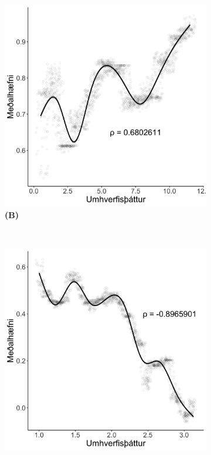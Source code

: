\documentclass[12pt]{article}
\begin{document}
\begin{figure}[h]
\begin{subfigure}{.5\textwidth}
        \includegraphics[width=\textwidth]{img/plotB.png}
        \caption*{\bfseries (B)}
    \end{subfigure} \\
    \begin{subfigure}{.5\textwidth}
        \centering
        \includegraphics[width=\textwidth]{img/plotC.png}

\end{subfigure}
\end{figure}
\end{document}
